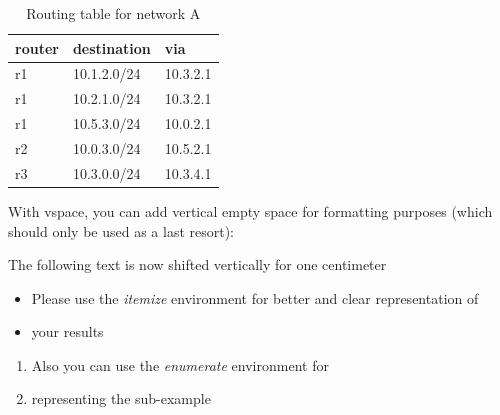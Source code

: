 \documentclass[parskip=full]{scrartcl}
\begin{document}

\begin{table}[hb]
	\centering
	\caption{Routing table for network A}
	\label{tab:routing}
	\begin{tabular}{lll}
		\toprule
		\textbf{router} & \textbf{destination} & \textbf{via}  \\ \midrule
		r1 & 10.1.2.0/24 & 10.3.2.1 \\
		r1 & 10.2.1.0/24 & 10.3.2.1 \\
		r1 & 10.5.3.0/24 & 10.0.2.1 \\
		\midrule
		r2 & 10.0.3.0/24 & 10.5.2.1 \\
		\midrule
		r3 & 10.3.0.0/24 & 10.3.4.1 \\
		\bottomrule
	\end{tabular}
\end{table}
With vspace, you can add vertical empty space for formatting purposes (which should only be used as a last resort):
\vspace*{1cm}

The following text is now shifted vertically for one centimeter

\begin{itemize}
	\item Please use the \textit{itemize} environment for better and clear representation of
	\item your results
\end{itemize}

\begin{enumerate}
	\item Also you can use the \textit{enumerate} environment for 
	\item representing the sub-example
\end{enumerate}

\printbibliography
\end{document}
